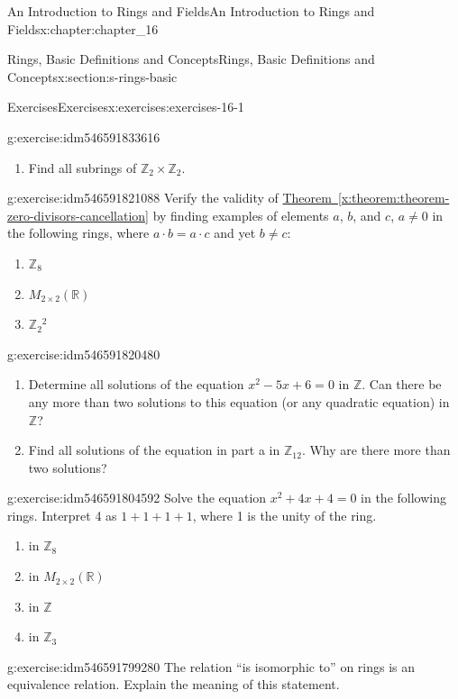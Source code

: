 \documentclass[oneside,10pt,]{book}
\newcommand{\xreffont}{\relax}
\numberwithin{equation}{section}
\begin{document}
\begin{chapterptx}{An Introduction to Rings and Fields}{}{An Introduction to Rings and Fields}{}{}{x:chapter:chapter_16}
\begin{sectionptx}{Rings, Basic Definitions and Concepts}{}{Rings, Basic Definitions and Concepts}{}{}{x:section:s-rings-basic}
\begin{exercises-subsection}{Exercises}{}{Exercises}{}{}{x:exercises:exercises-16-1}
\begin{divisionexercise}{5}{}{}{g:exercise:idm546591833616}
\begin{enumerate}[label=(\alph*)]
\item{}Find all subrings of \(\mathbb{Z}_2 \times \mathbb{Z}_2\).%
\end{enumerate}
%
\end{divisionexercise}%
\begin{divisionexercise}{6}{}{}{g:exercise:idm546591821088}%
Verify the validity of \hyperref[x:theorem:theorem-zero-divisors-cancellation]{Theorem~{\xreffont\ref{x:theorem:theorem-zero-divisors-cancellation}}} by finding examples of elements \(a\), \(b\), and \(c\),  \(a  \neq   0\) in the following rings, where \(a \cdot b = a \cdot  c\) and yet  \(b \neq  c\):%
\begin{enumerate}[label=(\alph*)]
\item{}\(\mathbb{Z}_8\)%
\item{}\(M_{2\times 2}(\mathbb{R})\)%
\item{}\(\mathbb{Z}_2{}^2\)%
\end{enumerate}
%
\end{divisionexercise}%
\begin{divisionexercise}{7}{}{}{g:exercise:idm546591820480}%
%
\begin{enumerate}[label=(\alph*)]
\item{}Determine all solutions of the equation \(x^2 - 5x + 6 = 0\) in \(\mathbb{Z}\).  Can there be any more than two solutions to this equation (or any quadratic equation) in \(\mathbb{Z}\)?%
\item{}Find all solutions of the equation in part a in \(\mathbb{Z}_{12}\). Why are there more than two solutions?%
\end{enumerate}
%
\end{divisionexercise}%
\begin{divisionexercise}{8}{}{}{g:exercise:idm546591804592}%
Solve the equation \(x^2 +4x + 4 = 0\) in the following rings. Interpret 4 as \(1 + 1 + 1 + 1\), where 1 is the unity of the ring.%
\begin{enumerate}[label=(\alph*)]
\item{}in  \(\mathbb{Z}_8\)%
\item{}in \(M_{2\times 2}(\mathbb{R})\)%
\item{}in  \(\mathbb{Z}\)%
\item{}in  \(\mathbb{Z}_3\)%
\end{enumerate}
%
\end{divisionexercise}%
\begin{divisionexercise}{9}{}{}{g:exercise:idm546591799280}%
The relation ``is isomorphic to'' on rings is an equivalence relation. Explain the meaning of this statement.%

\end{divisionexercise}
\end{exercises-subsection}
\end{sectionptx}
\end{chapterptx}
\end{document}
